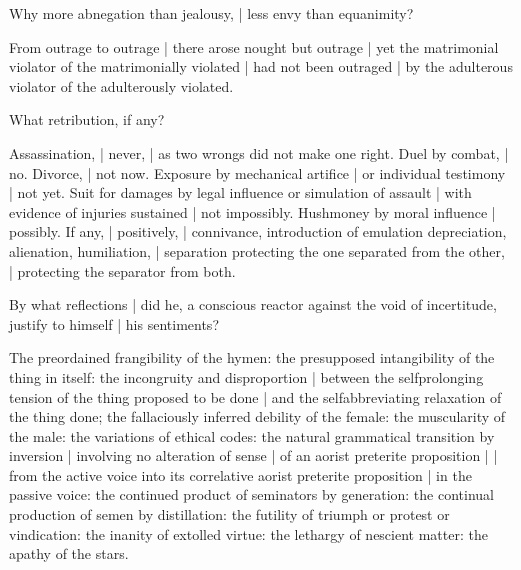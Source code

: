 Why more abnegation than jealousy, |
less envy than equanimity?

\Philosophy
From outrage
to outrage
 |
there arose nought but outrage
 |
yet the matrimonial violator of the matrimonially violated |
had not been outraged |
by the adulterous violator of the adulterously violated.


What retribution,
if any?

\Factual[~(legal)]
Assassination, |
never, |
as two wrongs did not make one right.
Duel by combat, |
no.
Divorce, |
not now.
Exposure by mechanical artifice
 |
or individual testimony
 |
not yet.
Suit for damages by legal influence or simulation of assault |
with evidence of injuries sustained
 |
not impossibly.
Hushmoney by moral influence |
possibly.
If any, |
positively, |
connivance,
introduction of emulation
depreciation, alienation, humiliation, |
separation protecting the one separated from the other, |
protecting the separator from both.



By what reflections |
did he,
a conscious reactor against the void of incertitude,
justify to himself |
his sentiments?

\Turns
The preordained frangibility of the hymen:
the presupposed intangibility of the thing in itself:
the incongruity and disproportion |
between the selfprolonging tension of the thing proposed to be done |
and the selfabbreviating relaxation of the thing done;
the fallaciously inferred debility of the female:
the muscularity of the male:
the variations of ethical codes:
the natural grammatical transition by inversion |
involving no alteration of sense |
of an aorist preterite proposition |
 |
from the active voice
into its correlative aorist preterite proposition |
in the passive voice:
the continued product of seminators by generation:
the continual production of semen by distillation:
the futility of triumph or protest or vindication:
the inanity of extolled virtue:
the lethargy of nescient matter:
the apathy of the stars.



